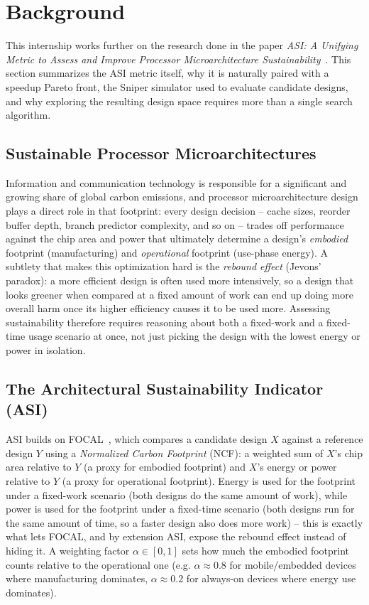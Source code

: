 \documentclass[12pt,a4paper,faculty=ea,language=en]{ugent-doc}
\begin{document}
\maketitle

{\hypersetup{hidelinks}\tableofcontents}
\newpage
\section{Background}
This internship works further on the research done in the paper \emph{ASI: A Unifying Metric to Assess and Improve Processor Microarchitecture Sustainability}~\cite{asi2026}. This section summarizes the ASI metric itself, why it is naturally paired with a speedup Pareto front, the Sniper simulator used to evaluate candidate designs, and why exploring the resulting design space requires more than a single search algorithm.

\subsection{Sustainable Processor Microarchitectures}
Information and communication technology is responsible for a significant and growing share of global carbon emissions, and processor microarchitecture design plays a direct role in that footprint: every design decision -- cache sizes, reorder buffer depth, branch predictor complexity, and so on -- trades off performance against the chip area and power that ultimately determine a design's \emph{embodied} footprint (manufacturing) and \emph{operational} footprint (use-phase energy). A subtlety that makes this optimization hard is the \emph{rebound effect} (Jevons' paradox): a more efficient design is often used more intensively, so a design that looks greener when compared at a fixed amount of work can end up doing more overall harm once its higher efficiency causes it to be used more.\cite{asi2026} Assessing sustainability therefore requires reasoning about both a fixed-work and a fixed-time usage scenario at once, not just picking the design with the lowest energy or power in isolation.

\subsection{The Architectural Sustainability Indicator (ASI)\cite{asi2026}}
ASI builds on FOCAL~\cite{focal2024}, which compares a candidate design $X$ against a reference design $Y$ using a \emph{Normalized Carbon Footprint} (NCF): a weighted sum of $X$'s chip area relative to $Y$ (a proxy for embodied footprint) and $X$'s energy or power relative to $Y$ (a proxy for operational footprint). Energy is used for the footprint under a fixed-work scenario (both designs do the same amount of work), while power is used for the footprint under a fixed-time scenario (both designs run for the same amount of time, so a faster design also does more work) -- this is exactly what lets FOCAL, and by extension ASI, expose the rebound effect instead of hiding it. A weighting factor $\alpha \in [0,1]$ sets how much the embodied footprint counts relative to the operational one (e.g. $\alpha \approx 0.8$ for mobile/embedded devices where manufacturing dominates, $\alpha \approx 0.2$ for always-on devices where energy use dominates).
\end{document}
